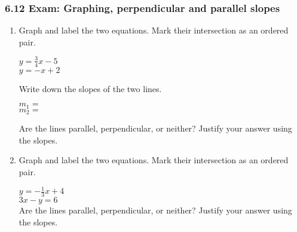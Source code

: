 \documentclass[12pt, twoside]{article}
\begin{document}
\subsubsection*{6.12 Exam: Graphing, perpendicular and parallel slopes}
  \begin{enumerate}

  \item Graph and label the two equations. Mark their intersection as an ordered pair.
    \begin{multicols}{2}
      $y =\frac{3}{4}x-5$ \\
      $y=-x+2$
    \end{multicols}     \vspace{0.1cm}
    Write down the slopes of the two lines.
    \begin{multicols}{2}
      $m_1=$ \\
      $m_2=$
    \end{multicols}     \vspace{0.1cm}
    Are the lines parallel, perpendicular, or neither? Justify your answer using the slopes.
    \vspace{3cm}
    \begin{center}
    \end{center}

\newpage
  \item Graph and label the two equations. Mark their intersection as an ordered pair.
      \begin{multicols}{2}
        $y =-\frac{1}{3}x+4$ \\[0.25cm]
        $3x-y=6$ \\
        Are the lines parallel, perpendicular, or neither? Justify your answer using the slopes.
      \end{multicols}     \vspace{0.1cm}
      \vspace{1cm}
      \begin{flushright} %
      \end{flushright}


\end{enumerate}
\end{document}
